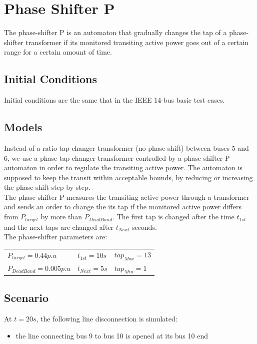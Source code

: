 \documentclass[a4paper, 12pt]{report}
\begin{document}
\newpage
\section{Phase Shifter P}
\label{PhaseShifterPAutomaton}

The phase-shifter P is an automaton that gradually changes the tap of a phase-shifter transformer if its monitored transiting active power goes out of a certain range for a certain amount of time.

\subsection{Initial Conditions}

Initial conditions are the same that in the IEEE 14-bus basic test cases.

\subsection{Models}

Instead of a ratio tap changer transformer (no phase shift) between buses 5 and 6, we use a phase tap changer transformer controlled by a phase-shifter P automaton in order to regulate the transiting active power.
The automaton is supposed to keep the transit within acceptable bounds, by reducing or increasing the phase shift step by step. \\

The phase-shifter P measures the transiting active power through a transformer and sends an order to change the its tap if the monitored active power differs from $P_{target}$ by more than $P_{DeadBand}$. The first tap is changed after the time $t_{1st}$ and the next taps are changed after $t_{Next}$ seconds.\\

The phase-shifter parameters are:
\begin{center}
\begin{tabular}{l|l|l}
   $P_{target}=0.44p.u$ & $t_{1st}=10s$ & $tap_{Max}=13$ \\
   $P_{DeadBand}=0.005p.u$  & $t_{Next}=5s$ & $tap_{Min}=1$ \\
\end{tabular}
\end{center}

\subsection{Scenario}
At $t=20s$, the following line disconnection is simulated:
\begin{itemize}
\item{the line connecting bus 9 to bus 10 is opened at its bus 10 end}
\end{itemize}
\end{document}
